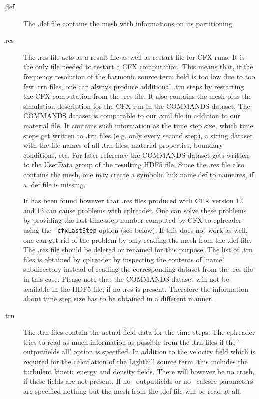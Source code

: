 \documentclass[a4paper,10pt]{article}
\begin{document}
\begin{description}
  \item[.def]  The  .def file  contains  the  mesh  with informations  on  its
    partitioning.

  \item[.res] The .res file acts as a  result file as well as restart file for
    CFX runs.  It  is the only file needed to restart  a CFX computation. This
    means that, if the frequency  resolution of the harmonic source term field
    is too  low due to too few  .trn files, one can  always produce additional
    .trn steps by restarting the CFX  computation from the .res file.  It also
    contains the mesh  plus the simulation description for the  CFX run in the
    COMMANDS dataset. The  COMMANDS dataset is comparable to  our .xml file in
    addition to  our material file. It  contains such information  as the time
    step size,  which time steps get  written to .trn files  (e.g.  only every
    second step),  a string  dataset with  the file names  of all  .trn files,
    material properties,  boundary conditions,  etc.  For later  reference the
    COMMANDS dataset gets written to  the UserData group of the resulting HDF5
    file.   Since the  .res file  also  contains the  mesh, one  may create  a
    symbolic link name.def to name.res, if a .def file is missing.

    It has been found however that .res files produced  with CFX version 12 and
    13 can cause problems with cplreader. One can solve these problems by
    providing the last time step number computed by CFX to cplreader using the
    \texttt{--cfxLastStep} option (see below). If this does not work as well,
    one can get rid of the problem by only reading the mesh from the .def file.
    The .res file should be deleted or renamed for this purpose. The list of
    .trn files is obtained by cplreader by inspecting the contents of 'name'
    subdirectory instead of reading the corresponding dataset from the .res file
    in this case. Please note that the COMMANDS dataset will not be available in
    the HDF5 file, if no .res is present. Therefore the information about time
    step size has to be obtained in a different manner.

  \item[.trn]  The .trn  files  contain the  actual  field data  for the  time
    steps. The  cplreader tries to read  as much information  as possible from
    the  .trn files  if  the  '--outputfields all'  option  is specified.   In
    addition to  the velocity field which  is required for  the calculation of
    the Lighthill source term, this  includes the turbulent kinetic energy and
    density fields.  There  will however be no crash, if  these fields are not
    present.  If  no --outputfields or  no --calcsrc parameters  are specified
    nothing but the mesh from the .def file will be read at all.
\end{description}
\end{document}
